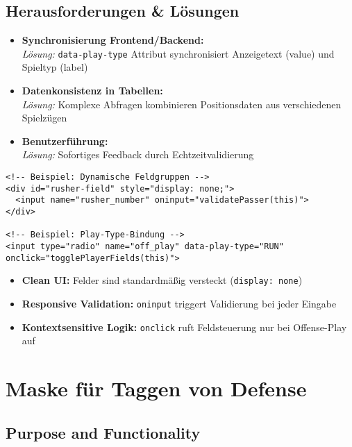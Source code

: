 \documentclass[12pt]{article}
\begin{document}
\subsection*{Herausforderungen \& Lösungen}

\begin{itemize}
    \item \textbf{Synchronisierung Frontend/Backend:}\\
    \textit{Lösung:} \texttt{data-play-type} Attribut synchronisiert Anzeigetext (value) und Spieltyp (label)

    \item \textbf{Datenkonsistenz in Tabellen:}\\
    \textit{Lösung:} Komplexe Abfragen kombinieren Positionsdaten aus verschiedenen Spielzügen

    \item \textbf{Benutzerführung:}\\
    \textit{Lösung:} Sofortiges Feedback durch Echtzeitvalidierung
\end{itemize}

\begin{verbatim}
<!-- Beispiel: Dynamische Feldgruppen -->
<div id="rusher-field" style="display: none;">
  <input name="rusher_number" oninput="validatePasser(this)">
</div>

<!-- Beispiel: Play-Type-Bindung -->
<input type="radio" name="off_play" data-play-type="RUN" onclick="togglePlayerFields(this)">
\end{verbatim}

\begin{itemize}
    \item \textbf{Clean UI:} Felder sind standardmäßig versteckt (\texttt{display: none})
    \item \textbf{Responsive Validation:} \texttt{oninput} triggert Validierung bei jeder Eingabe
    \item \textbf{Kontextsensitive Logik:} \texttt{onclick} ruft Feldsteuerung nur bei Offense-Play auf
\end{itemize}

\section{Maske für Taggen von Defense}
\subsection{Purpose and Functionality}
\end{document}
